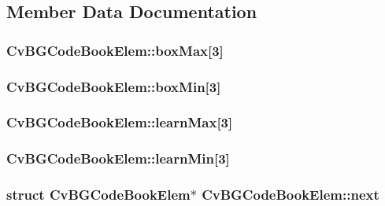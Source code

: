 \subsection{Member Data Documentation}
\hypertarget{structCvBGCodeBookElem_aeb547cb5906020208a85f248c2ab0bb1}{
\subsubsection[{box\-Max}]{ Cv\-B\-G\-Code\-Book\-Elem\-::box\-Max\mbox{[}3\mbox{]}}}\label{structCvBGCodeBookElem_aeb547cb5906020208a85f248c2ab0bb1}
\hypertarget{structCvBGCodeBookElem_a6b925a6b35bed62c439693f7577aba4f}{
\subsubsection[{box\-Min}]{ Cv\-B\-G\-Code\-Book\-Elem\-::box\-Min\mbox{[}3\mbox{]}}}\label{structCvBGCodeBookElem_a6b925a6b35bed62c439693f7577aba4f}
\hypertarget{structCvBGCodeBookElem_afe28345688cc1b32ebf5afeaef1aacec}{
\subsubsection[{learn\-Max}]{ Cv\-B\-G\-Code\-Book\-Elem\-::learn\-Max\mbox{[}3\mbox{]}}}\label{structCvBGCodeBookElem_afe28345688cc1b32ebf5afeaef1aacec}
\hypertarget{structCvBGCodeBookElem_acf9a1d5717a48a059dc918ecb66f41e1}{
\subsubsection[{learn\-Min}]{ Cv\-B\-G\-Code\-Book\-Elem\-::learn\-Min\mbox{[}3\mbox{]}}}\label{structCvBGCodeBookElem_acf9a1d5717a48a059dc918ecb66f41e1}
\hypertarget{structCvBGCodeBookElem_a90f5d806cca33a8c32fb4a0f164cb012}{
\subsubsection[{next}]{\setlength{\rightskip}{0pt plus 5cm}struct {\bf Cv\-B\-G\-Code\-Book\-Elem}$\ast$ Cv\-B\-G\-Code\-Book\-Elem\-::next}}\label{structCvBGCodeBookElem_a90f5d806cca33a8c32fb4a0f164cb012}
